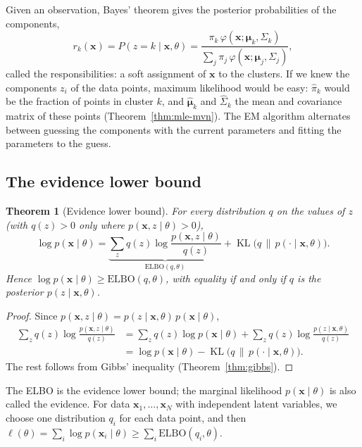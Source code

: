 \documentclass[11pt]{article}
\DeclareMathOperator{\KL}{KL}
\theoremstyle{definition}
\theoremstyle{plain}
\newtheorem{theorem}[definition]{Theorem}
\theoremstyle{remark}
\begin{document}
Given an observation, Bayes' theorem gives the posterior probabilities of the components,
\[r_k(\mathbf{x}) = P(z = k \mid \mathbf{x}, \theta) = \frac{\pi_k\,\varphi(\mathbf{x}; \boldsymbol{\mu}_k, \Sigma_k)}{\sum_j \pi_j\,\varphi(\mathbf{x}; \boldsymbol{\mu}_j, \Sigma_j)},\]
called the responsibilities: a soft assignment of $\mathbf{x}$ to the clusters. If we knew the components $z_i$ of the data points, maximum likelihood would be easy: $\hat\pi_k$ would be the fraction of points in cluster $k$, and $\hat{\boldsymbol{\mu}}_k$ and $\hat\Sigma_k$ the mean and covariance matrix of these points (Theorem~\ref{thm:mle-mvn}). The EM algorithm alternates between guessing the components with the current parameters and fitting the parameters to the guess.

\subsection{The evidence lower bound}

\begin{theorem}[Evidence lower bound]\label{thm:elbo}
    For every distribution $q$ on the values of $z$ (with $q(z) > 0$ only where $p(\mathbf{x}, z \mid \theta) > 0$),
    \[\log p(\mathbf{x} \mid \theta) = \underbrace{\sum_z q(z)\log\frac{p(\mathbf{x}, z \mid \theta)}{q(z)}}_{\mathrm{ELBO}(q, \theta)} + \KL\big(q \,\|\, p(\cdot \mid \mathbf{x}, \theta)\big).\]
    Hence $\log p(\mathbf{x} \mid \theta) \geq \mathrm{ELBO}(q, \theta)$, with equality if and only if $q$ is the posterior $p(z \mid \mathbf{x}, \theta)$.
\end{theorem}

\begin{proof}
    Since $p(\mathbf{x}, z \mid \theta) = p(z \mid \mathbf{x}, \theta)\,p(\mathbf{x} \mid \theta)$,
    \begin{align*}
        \sum_z q(z)\log\frac{p(\mathbf{x}, z \mid \theta)}{q(z)} &= \sum_z q(z)\log p(\mathbf{x} \mid \theta) + \sum_z q(z)\log\frac{p(z \mid \mathbf{x}, \theta)}{q(z)} \\
        &= \log p(\mathbf{x} \mid \theta) - \KL\big(q \,\|\, p(\cdot \mid \mathbf{x}, \theta)\big).
    \end{align*}
    The rest follows from Gibbs' inequality (Theorem~\ref{thm:gibbs}).
\end{proof}

The ELBO is the evidence lower bound; the marginal likelihood $p(\mathbf{x} \mid \theta)$ is also called the evidence. For data $\mathbf{x}_1, \ldots, \mathbf{x}_N$ with independent latent variables, we choose one distribution $q_i$ for each data point, and then $\ell(\theta) = \sum_i \log p(\mathbf{x}_i \mid \theta) \geq \sum_i \mathrm{ELBO}(q_i, \theta)$.
\end{document}
